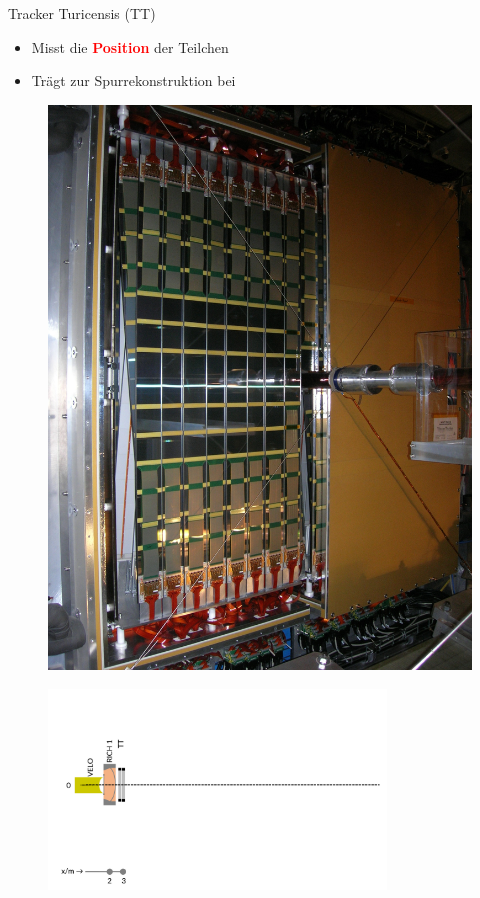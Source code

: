 \begin{frame}{Tracker Turicensis (TT)}
    \begin{minipage}{0.58\textwidth}
    \begin{itemize}
        \item Misst die \textcolor{red}{\textbf{Position}} der Teilchen
        \item Trägt zur Spurrekonstruktion bei
    \end{itemize}
    \end{minipage}\hfill
    \begin{minipage}{0.38\textwidth}
        \begin{figure}[h]
        \centering
        \includegraphics[height=2.5 cm]{Figures Introductory Lecture/LHCb Detector/LHCb_TT.jpg}%
        \end{figure}
    \end{minipage}
    \vspace{-0.5cm}
    \begin{figure}[h]
    \centering
    \includegraphics[width=0.8\textwidth]{Figures Introductory Lecture/LHCb Detector/LHCb_3_DE.png}
    \end{figure}
\end{frame}
